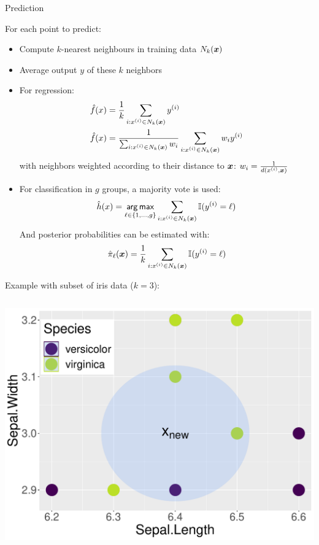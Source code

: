 \documentclass[11pt,compress,t,notes=noshow, xcolor=table]{beamer}
\newenvironment{knitrout}{}{} %
\begin{document}
\begin{vbframe}{Prediction}

For each point to predict:  
\begin{itemize}
\item Compute $k$-nearest neighbours in training data $N_k(\bm{x})$
\item Average output $y$ of these $k$ neighbors 
\item For regression:
\begin{align*}
\hat{f}(x) &= \frac{1}{k} \sum_{i: x^{(i)} \in N_k(\bm{x})} y^{(i)} \\
\hat{f}(x) &= \frac{1}{\sum_{i: x^{(i)} \in N_k(\bm{x})} w_i} \sum_{i: x^{(i)} \in N_k(\bm{x})} w_i y^{(i)}
\end{align*}
with neighbors weighted according to their distance to $\bm{x}$: $w_i = \frac{1}{d(x^{(i)}, \bm{x})}$

\framebreak

\item For classification in $g$ groups, a majority vote is used: \\
$$
\hat{h}(x) = \mathop{\sf arg\,max}_{\ell \in \{1, \ldots, g\}} \sum_{i: x^{(i)} \in N_k(\bm{x})} \mathbb{I}(y^{(i)} = \ell)
$$
And posterior probabilities can be estimated with:
$$
\hat{\pi}_{\ell}(\bm{x})= \frac{1}{k} \sum_{i: x^{(i)} \in N_k(\bm{x})} \mathbb{I}(y^{(i)} = \ell)
$$
\end{itemize}

\framebreak

Example with subset of iris data ($k = 3$): \\
\begin{columns}[T]
  \begin{column}{0.5\textwidth}
\begin{knitrout}\scriptsize
{}\color{fgcolor}

{\centering \includegraphics[width=\textwidth]{figure/reg_class_knn_1} 

}
\end{knitrout}
\end{column}
\end{columns}
\end{vbframe}
\end{document}
